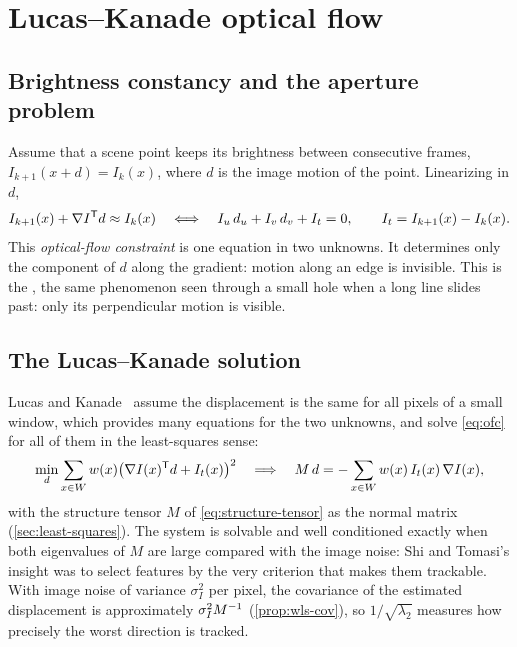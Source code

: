 \section{Lucas--Kanade optical flow}

\subsection{Brightness constancy and the aperture problem}

Assume that a scene point keeps its brightness between consecutive frames, $I_{k+1}(x + d) = I_k(x)$, where $d$ is the image motion of the point. Linearizing in $d$,
\begin{equation}
  I_{k+1}(x) + \nabla I^{\mathsf{T}} d \approx I_k(x)
  \quad\Longleftrightarrow\quad
  I_u\,d_u + I_v\,d_v + I_t = 0, \qquad I_t = I_{k+1}(x) - I_k(x).
  \label{eq:ofc}
\end{equation}
This \emph{optical-flow constraint} is one equation in two unknowns. It determines only the component of $d$ along the gradient: motion along an edge is invisible.
This is the , the same phenomenon seen through a small hole when a long line slides past: only its perpendicular motion is visible.

\subsection{The Lucas--Kanade solution}

Lucas and Kanade~\cite{lucas1981iterative} assume the displacement is the same for all pixels of a small window, which provides many equations for the two
unknowns, and solve \eqref{eq:ofc} for all of them in the least-squares sense:
\begin{equation}
  \min_d \sum_{x\in W}w(x)\big(\nabla I(x)^{\mathsf{T}} d + I_t(x)\big)^2
  \quad\Longrightarrow\quad
  M\,d = -\sum_{x\in W}w(x)\,I_t(x)\,\nabla I(x),
  \label{eq:lk}
\end{equation}
with the structure tensor $M$ of \eqref{eq:structure-tensor} as the normal matrix (\cref{sec:least-squares}). The system is solvable and well conditioned exactly when both
eigenvalues of $M$ are large compared with the image noise: Shi and Tomasi's insight was to select features by the very criterion that makes them trackable. With
image noise of variance $\sigma_I^2$ per pixel, the covariance of the estimated displacement is approximately $\sigma_I^2M^{-1}$ (\cref{prop:wls-cov}), so $1/\sqrt{\lambda_2}$ measures
how precisely the worst direction is tracked.


